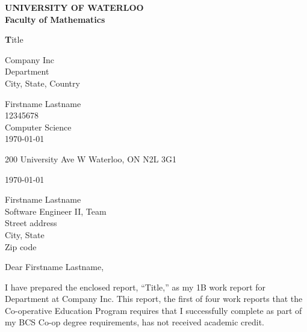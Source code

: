 \documentclass[titlepage, 12pt]{article}
\begin{document}
\newcommand\student{Firstname Lastname}
\newcommand\watid{12345678}
\newcommand\level{1B}
\newcommand\program{Computer Science}
\newcommand\degree{BCS}
\newcommand\reportnum{first}    %
\newcommand\address{200 University Ave W\newline
                    Waterloo, ON\newline
                    N2L 3G1}
\newcommand\reporttitle{Title}
\newcommand\company{Company Inc}
\newcommand\supervisor{Firstname Lastname}
\newcommand\supervisortitle{Software Engineer II, Team}
\newcommand\department{Department}
\newcommand\officeshortaddress{City, State, Country}
\newcommand\officeaddress{Street address\\ City, State \\ Zip code}

\newcommand\reportsummary{
    Second paragraph of the Letter of Submittal goes here.
}

\begin{titlepage}
\begin{center}
    \textbf{UNIVERSITY OF WATERLOO \\ Faculty of Mathematics}
\end{center}
\vfill
\begin{center}
    \textbf\reporttitle
\end{center}
\vfill
\begin{center}
    {\company \\ \department \\ \officeshortaddress}
\end{center}
\vfill\vfill  %
\begin{center}
    \student \\
    \watid \\
    \program \\
    \monthyeardate\today
\end{center}
\end{titlepage}
\thispagestyle{empty} %
\address

\today

\supervisor \\
\supervisortitle \\
\officeaddress

Dear \supervisor,

I have prepared the enclosed report, ``\reporttitle{},''
as my \level{} work report for \department{} at \company{}.
This report, the \reportnum{} of four work reports that the
Co-operative Education Program requires that I successfully complete as part
of my \degree{} Co-op degree requirements, has not received academic credit.
\end{document}
